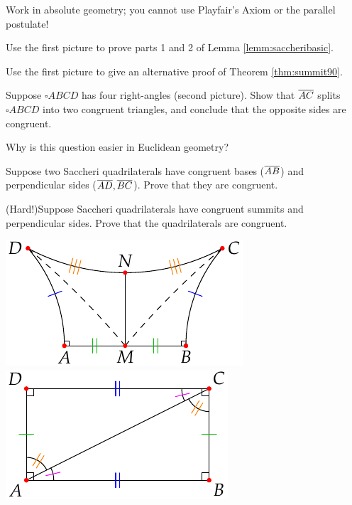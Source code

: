 \begin{exercises}
	Work in absolute geometry; you cannot use Playfair's Axiom or the parallel postulate!
	\begin{enumerate}
		\begin{minipage}[t]{0.66\linewidth}\vspace{-2pt}
		  \item Use the first picture to prove parts 1 and 2 of Lemma \ref{lemm:saccheribasic}.

		  \item Use the first picture to give an alternative proof of Theorem \ref{thm:summit90}.
		
			\item\label{exs:rectanglesplit} Suppose $\square ABCD$ has four right-angles (second picture). Show that $\overline{AC}$ splits $\square ABCD$ into two congruent triangles, and conclude that the opposite sides are congruent.\par
			Why is this question easier in Euclidean geometry?
	
			\item\label{exs:saccherisplit} Suppose two Saccheri quadrilaterals have congruent bases ($\overline{AB}$) and perpendicular sides ($\overline{AD},\overline{BC}$). Prove that they are congruent.
		    		
			\item (Hard!)\lstsp Suppose Saccheri quadrilaterals have congruent summits and perpendicular sides. Prove that the quadrilaterals are congruent.
		\end{minipage}
		\hfill
		\begin{minipage}[t]{0.33\linewidth}\vspace{-8pt}
			\flushright\includegraphics[scale=0.9]{history-saccheri2}\\
			\includegraphics[scale=0.9]{basic-rect}
		\end{minipage}	
	\end{enumerate}

\end{exercises}

